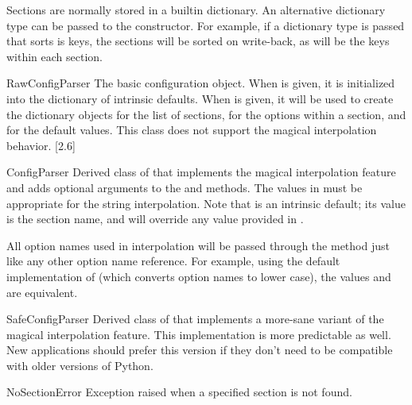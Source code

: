 Sections are normally stored in a builtin dictionary. An alternative
dictionary type can be passed to the  constructor.
For example, if a dictionary type is passed that sorts is keys,
the sections will be sorted on write-back, as will be the keys within
each section.

\begin{classdesc}{RawConfigParser}{}
The basic configuration object.  When  is given, it is
initialized into the dictionary of intrinsic defaults.  When 
is given, it will be used to create the dictionary objects for the list
of sections, for the options within a section, and for the default values.
This class does not support the magical interpolation behavior.
[2.6]
\end{classdesc}

\begin{classdesc}{ConfigParser}{}
Derived class of  that implements the magical
interpolation feature and adds optional arguments to the 
and  methods.  The values in  must be
appropriate for the  string interpolation.  Note that
 is an intrinsic default; its value is the section name,
and will override any value provided in .

All option names used in interpolation will be passed through the
 method just like any other option name
reference.  For example, using the default implementation of
 (which converts option names to lower case),
the values  and  are
equivalent.
\end{classdesc}

\begin{classdesc}{SafeConfigParser}{}
Derived class of  that implements a more-sane
variant of the magical interpolation feature.  This implementation is
more predictable as well.
New applications should prefer this version if they don't need to be
compatible with older versions of Python.
\end{classdesc}

\begin{excdesc}{NoSectionError}
Exception raised when a specified section is not found.
\end{excdesc}

